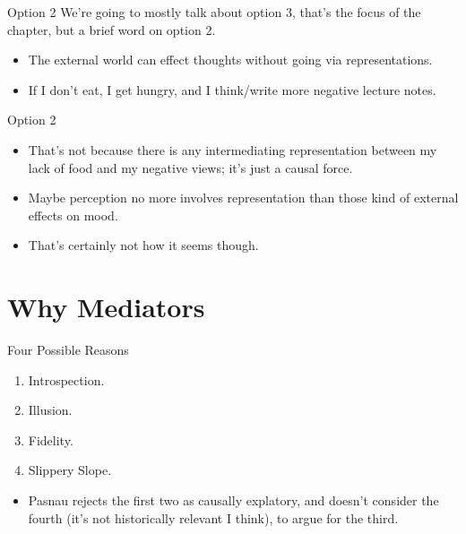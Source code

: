\documentclass[
  17pt,
  letterpaper,
  ignorenonframetext,
  aspectratio=169,
  handout]{beamer}
\providecommand{\tightlist}{%
  \setlength{\itemsep}{0pt}\setlength{\parskip}{0pt}}\usepackage{longtable,booktabs,array}
\begin{document}
\begin{frame}{Option 2}
\protect\hypertarget{option-2}{}
We're going to mostly talk about option 3, that's the focus of the
chapter, but a brief word on option 2.

\begin{itemize}[<+->]
\tightlist
\item
  The external world can effect thoughts without going via
  representations.
\item
  If I don't eat, I get hungry, and I think/write more negative lecture
  notes.
\end{itemize}
\end{frame}

\begin{frame}{Option 2}
\protect\hypertarget{option-2-1}{}
\begin{itemize}[<+->]
\tightlist
\item
  That's not because there is any intermediating representation between
  my lack of food and my negative views; it's just a causal force.
\item
  Maybe perception no more involves representation than those kind of
  external effects on mood.
\item
  That's certainly not how it seems though.
\end{itemize}
\end{frame}

\hypertarget{why-mediators}{%
\section{Why Mediators}\label{why-mediators}}

\begin{frame}{Four Possible Reasons}
\protect\hypertarget{four-possible-reasons}{}
\begin{enumerate}[<+->]
\tightlist
\item
  Introspection.
\item
  Illusion.
\item
  Fidelity.
\item
  Slippery Slope.
\end{enumerate}

\begin{itemize}[<+->]
\tightlist
\item
  Pasnau rejects the first two as causally explatory, and doesn't
  consider the fourth (it's not historically relevant I think), to argue
  for the third.
\end{itemize}
\end{frame}
\end{document}
